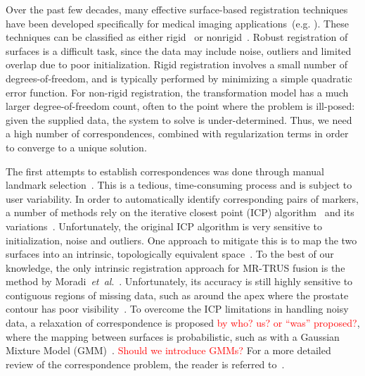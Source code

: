 \documentclass[journal]{IEEEtran}
\newcommand{\comment}[1]{\textcolor{red}{#1}}
\begin{document}
Over the past few decades, many effective surface-based registration techniques have been developed specifically for medical imaging applications~(e.g. \cite{Besl92a,Brown07a,Chui03a,Huang07a,Jian11a,Myronenko10a,Wand09a}). These techniques can be classified as either rigid~\cite{Besl92a} or nonrigid~\cite{Brown07a,Chui03a,Huang07a,Masutani01a,Myronenko10a,Wand09a}. Robust registration of surfaces is a difficult task, since the data may include noise, outliers and limited overlap due to poor initialization. Rigid registration involves a small number of degrees-of-freedom, and is typically performed by minimizing a simple quadratic error function.  For non-rigid registration, the transformation model has a much larger degree-of-freedom count, often to the point where the problem is ill-posed: given the supplied data, the system to solve is under-determined.  Thus, we need a high number of correspondences, combined with regularization terms in order to converge to a unique solution.

The first attempts to establish correspondences was done through manual landmark selection~\cite{Cootes95a}.  This is a tedious, time-consuming process and is subject to user variability. In order to automatically identify corresponding pairs of markers, a number of methods rely on the iterative closest point (ICP) algorithm~\cite{Besl92a,Zhang94a} and its variations~\cite{Besl92a,Rohr96a,Rucker14a,Zhang94a}. Unfortunately, the original ICP algorithm is very sensitive to initialization, noise and outliers. One approach to mitigate this is to map the two surfaces into an intrinsic, topologically equivalent space~\cite{Huang07a,Yeo10a,Moradi12a}. To the best of our knowledge, the only intrinsic registration approach for MR-TRUS fusion is the method by Moradi~\textit{et~al}.~\cite{Moradi12a}. Unfortunately, its accuracy is still highly sensitive to contiguous regions of missing data, such as around the apex where the prostate contour has poor visibility~\cite{Moradi12a}. To overcome the ICP limitations in handling noisy data, a relaxation of correspondence is proposed \comment{by who? us? or ``was'' proposed?}, where the mapping between surfaces is probabilistic, such as with a Gaussian Mixture Model (GMM)~\cite{Chui03a,Jian11a,Myronenko10a}. \comment{Should we introduce GMMs?} For a more detailed review of the correspondence problem, the reader is referred to~\cite{Kaick11a}.
\end{document}
